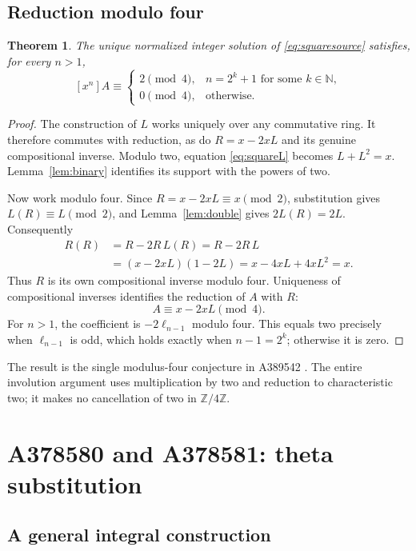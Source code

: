 \documentclass[11pt,a4paper]{article}
\newtheorem{theorem}{Theorem}[section]
\theoremstyle{remark}
\newcommand{\Z}{\mathbb Z}
\newcommand{\N}{\mathbb N}
\begin{document}
\subsection{Reduction modulo four}

\begin{theorem}\label{thm:squareresidue}
The unique normalized integer solution of \eqref{eq:squaresource} satisfies,
for every $n>1$,
\[
 [x^n]A\equiv
 \begin{cases}
  2\pmod4,&n=2^k+1\text{ for some }k\in\N,\\
  0\pmod4,&\text{otherwise}.
 \end{cases}
\]
\end{theorem}

\begin{proof}
The construction of $L$ works uniquely over any commutative ring.
It therefore commutes with reduction, as do $R=x-2xL$ and its genuine
compositional inverse. Modulo two, equation \eqref{eq:squareL} becomes
$L+L^2=x$. Lemma~\ref{lem:binary} identifies its support with the powers
of two.

Now work modulo four. Since $R=x-2xL\equiv x\pmod2$, substitution gives
$L(R)\equiv L\pmod2$, and Lemma~\ref{lem:double} gives
$2L(R)=2L$. Consequently
\begin{align*}
 R(R)&=R-2R\,L(R)=R-2R\,L\\
     &=(x-2xL)(1-2L)=x-4xL+4xL^2=x.
\end{align*}
Thus $R$ is its own compositional inverse modulo four.
Uniqueness of compositional inverses identifies the reduction of $A$
with $R$:
\[
 A\equiv x-2xL\pmod4.
\]
For $n>1$, the coefficient is $-2\ell_{n-1}$ modulo four. This equals
two precisely when $\ell_{n-1}$ is odd, which holds exactly when
$n-1=2^k$; otherwise it is zero.
\end{proof}

The result is the single modulus-four conjecture in A389542
\cite{oeis542}. The entire involution argument uses multiplication by
two and reduction to characteristic two; it makes no cancellation of
two in $\Z/4\Z$.

\section{A378580 and A378581: theta substitution}

\subsection{A general integral construction}
\end{document}
